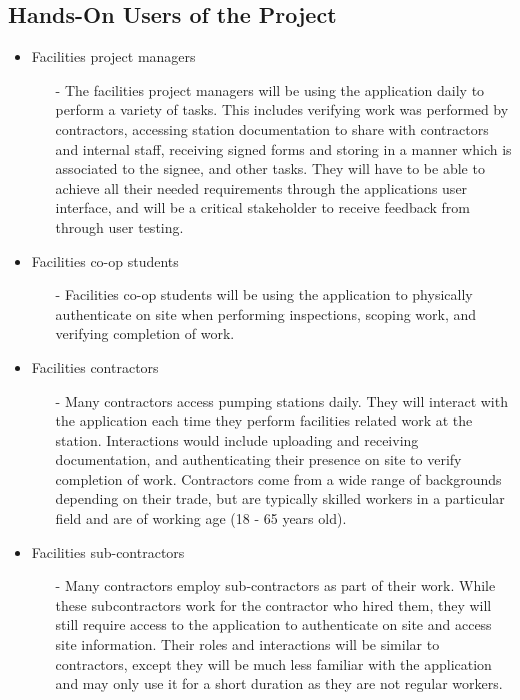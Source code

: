 \documentclass[12pt]{article}
\begin{document}
\subsection{Hands-On Users of the Project}
\begin{itemize}
  \item Facilities project managers
    \begin{itemize}
      \item[-] The facilities project managers will be using the application
        daily to perform a variety of tasks. This includes verifying work was
        performed by contractors, accessing station documentation to share with
        contractors and internal staff, receiving signed forms and storing in a
        manner which is associated to the signee, and other tasks.
        They will have to be able to achieve all their needed requirements
        through the applications user interface, and will be a critical
        stakeholder to receive feedback from through user testing.
    \end{itemize}
  \item Facilities co-op students
    \begin{itemize}
      \item[-] Facilities co-op students will be using the application to
        physically authenticate on site when performing inspections,
        scoping work, and verifying completion of work.
    \end{itemize}
  \item Facilities contractors
    \begin{itemize}
      \item[-] Many contractors access pumping stations daily. They will
        interact with the application each time they perform facilities related
        work at the station. Interactions would include uploading and
        receiving documentation, and authenticating their presence on site
        to verify completion of work.
        Contractors come from a wide range of backgrounds depending on their
        trade, but are typically skilled workers in a particular field and are
        of working age (18 - 65 years old).
    \end{itemize}
  \item Facilities sub-contractors
    \begin{itemize}
      \item[-] Many contractors employ sub-contractors as part of their work.
        While these subcontractors work for the contractor who hired them, they
        will still require access to the application to authenticate on site
        and access site information. Their roles and interactions
        will be similar to contractors, except they will be much less familiar
        with the application and may only use it for a short duration as they
        are not regular workers.
    \end{itemize}
\end{itemize}
\end{document}
